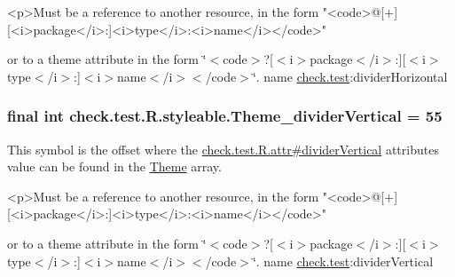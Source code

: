 \begin{DoxyVerb}      <p>Must be a reference to another resource, in the form "<code>@[+][<i>package</i>:]<i>type</i>:<i>name</i></code>"
\end{DoxyVerb}
 or to a theme attribute in the form \char`\"{}$<$code$>$?\mbox{[}$<$i$>$package$<$/i$>$\+:\mbox{]}\mbox{[}$<$i$>$type$<$/i$>$\+:\mbox{]}$<$i$>$name$<$/i$>$$<$/code$>$\char`\"{}.  name \hyperlink{namespacecheck_1_1test}{check.\+test}\+:divider\+Horizontal \hypertarget{classcheck_1_1test_1_1_r_1_1styleable_a377c24517d2d2e1fec3897b381126055}{}
\subsubsection[{Theme\+\_\+divider\+Vertical}]{\setlength{\rightskip}{0pt plus 5cm}final int check.\+test.\+R.\+styleable.\+Theme\+\_\+divider\+Vertical = 55\hspace{0.3cm}{\ttfamily [static]}}\label{classcheck_1_1test_1_1_r_1_1styleable_a377c24517d2d2e1fec3897b381126055}
This symbol is the offset where the \hyperlink{classcheck_1_1test_1_1_r_1_1attr_a64fcf0c48c0723bf9361cd965752e00e}{check.\+test.\+R.\+attr\#divider\+Vertical} attribute\textquotesingle{}s value can be found in the \hyperlink{classcheck_1_1test_1_1_r_1_1styleable_acca726d02016a0cf607782ec3a436a81}{Theme} array.

\begin{DoxyVerb}      <p>Must be a reference to another resource, in the form "<code>@[+][<i>package</i>:]<i>type</i>:<i>name</i></code>"
\end{DoxyVerb}
 or to a theme attribute in the form \char`\"{}$<$code$>$?\mbox{[}$<$i$>$package$<$/i$>$\+:\mbox{]}\mbox{[}$<$i$>$type$<$/i$>$\+:\mbox{]}$<$i$>$name$<$/i$>$$<$/code$>$\char`\"{}.  name \hyperlink{namespacecheck_1_1test}{check.\+test}\+:divider\+Vertical \hypertarget{classcheck_1_1test_1_1_r_1_1styleable_a4b8e66fe596de4f95de89a3fb97316d8}{}

